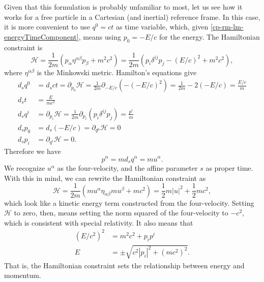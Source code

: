 Given that this formulation is probably unfamiliar to most, let us see how it works for a free particle in a Cartesian (and inertial) reference frame. In this case, it is more convenient to use $q^0=ct$ as time variable, which, given \ref{cp-rm-lm-energyTimeComponent}, means using $p_0=-E/c$ for the energy. The Hamiltonian constraint is
\begin{equation}
	\mathcal{H} = \frac{1}{2m} \left(p_\alpha \eta^{\alpha\beta} p_\beta + m^2c^2  \right) = \frac{1}{2m} \left(p_i \delta^{ij} p_j - (E/c)^2 + m^2c^2  \right),
\end{equation}
where $\eta^{\alpha\beta}$ is the Minkowski metric. Hamilton's equations give
\begin{equation}
	\begin{aligned}
		d_s q^0 &= d_s ct = \partial_{p_0} \mathcal{H} = \frac{1}{2m}  \partial_{-E/c} (- (-E/c)^2) = \frac{1}{2m} - 2 (-E/c) = \frac{E/c}{m} \\
		d_s t &= \frac{E}{mc^2} \\
		d_s q^i &= \partial_{p_i} \mathcal{H} = \frac{1}{2m} \partial_{p_i} \left( p_i \delta^{ij} p_j \right) = \frac{p^i}{m} \\
		d_s p_0 &= d_s (-E/c) = \partial_{q^0} \mathcal{H} = 0 \\
		d_s p_i &= \partial_{q^i} \mathcal{H} = 0.
	\end{aligned}
\end{equation}
Therefore we have
\begin{equation}
	p^\alpha = m d_s q^\alpha = m u^\alpha.
\end{equation}
We recognize $u^\alpha$ as the four-velocity, and the affine parameter $s$ as proper time. With this in mind, we can rewrite the Hamiltonian constraint as
\begin{equation}
	\mathcal{H} = \frac{1}{2m} \left( mu^\alpha \eta_{\alpha\beta} mu^\beta + mc^2 \right) = \frac{1}{2} m |u|^2 + \frac{1}{2} m c^2,
\end{equation}
which look like a kinetic energy term constructed from the four-velocity. Setting $\mathcal{H}$ to zero, then, means setting the norm squared of the four-velocity to $-c^2$, which is consistent with special relativity. It also means that 
\begin{equation}
	\begin{aligned}
		(E/c^2)^2 &= m^2c^2 + p_i p^i \\
		E &= \pm \sqrt{c^2 |p_i|^2 + (mc^2)^2 }.
	\end{aligned}
\end{equation}
That is, the Hamiltonian constraint sets the relationship between energy and momentum.

